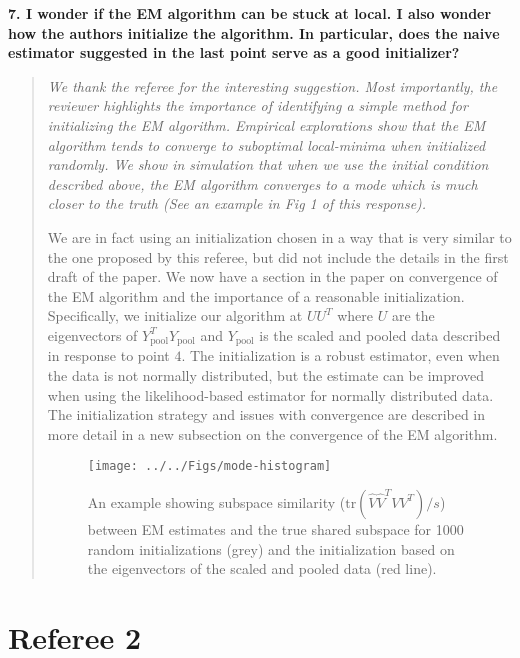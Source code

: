 \documentclass{article}
\newcommand{\tr}{\text{tr}}
\newenvironment{resp}{\begin{quotation}\noindent\slshape}{\end{quotation}}
\begin{document}
\textbf{7. I wonder if the EM algorithm can be stuck at local. I also wonder how the authors initialize the algorithm. In particular, does the naive estimator suggested in the last point serve as a good initializer?}

\begin{resp}
We thank the referee for the interesting suggestion.  %
Most importantly, the reviewer highlights the importance of identifying a simple method for initializing the EM algorithm. Empirical explorations show that the EM algorithm tends to converge to suboptimal local-minima when initialized randomly.  We show in simulation that when we use the initial condition described above, the EM algorithm converges to a mode which is much closer to the truth (See an example in Fig 1 of this response).  

We are in fact using an initialization chosen in a way that is very similar to the one proposed by this referee, but did not include the details in the first draft of the paper.  We now have a section in the paper on convergence of the EM algorithm and the importance of a reasonable initialization.  Specifically, we initialize our algorithm at $UU^T$ where $U$ are the eigenvectors of $Y_{\text{pool}}^T Y_{\text{pool}}$ and $Y_{\text{pool}}$ is the scaled and pooled data described in response to point $4$.  The initialization is a robust estimator, even when the data is not normally distributed, but the estimate can be improved when using the likelihood-based estimator for normally distributed data. The initialization strategy and issues with convergence are described in more detail in a new subsection on the convergence of the EM algorithm.  


\begin{figure}[t]
    \centering
    \texttt{[image: ../../Figs/mode-histogram]}
        \label{fig:modeHist}
    \caption{ An example showing subspace similarity ($\tr(\hat{V}\hat{V}^TVV^T)/s$)
      between EM estimates and the true shared subspace for 1000 random initializations (grey) and the initialization based on the eigenvectors of the scaled and pooled data (red line).  }
\end{figure}
\end{resp}

\section*{Referee 2}
\end{document}
